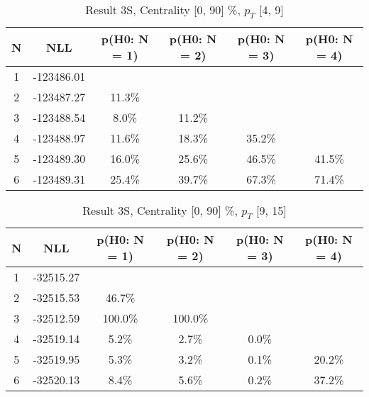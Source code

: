 \begin{table}[htb]
	\begin{center}
	\caption{Result 3S, Centrality [0, 90] \%, $p_{T}$ [4, 9] \GeV
}
{\footnotesize\renewcommand{\arraystretch}{1.4}
		\begin{tabular}{cc||>{\columncolor[gray]{0.8}}cccc}
			N & NLL & p(H0: N = 1) & p(H0: N = 2) & p(H0: N = 3) & p(H0: N = 4)\\ 
		\hline
1 & -123486.01 & & & & \\
2 & -123487.27 & 11.3\% & & & \\
3 & -123488.54 & 8.0\% & 11.2\% & & \\
4 & -123488.97 & 11.6\% & 18.3\% & 35.2\% & \\
5 & -123489.30 & 16.0\% & 25.6\% & 46.5\% & 41.5\% \\
6 & -123489.31 & 25.4\% & 39.7\% & 67.3\% & 71.4\% \\
	\end{tabular}
		\label{tab:lab}
	}
	\end{center}\end{table}

\begin{table}[htb]
	\begin{center}
	\caption{Result 3S, Centrality [0, 90] \%, $p_{T}$ [9, 15] \GeV
}
{\footnotesize\renewcommand{\arraystretch}{1.4}
		\begin{tabular}{cc||>{\columncolor[gray]{0.8}}cccc}
			N & NLL & p(H0: N = 1) & p(H0: N = 2) & p(H0: N = 3) & p(H0: N = 4)\\ 
		\hline
1 & -32515.27 & & & & \\
2 & -32515.53 & 46.7\% & & & \\
3 & -32512.59 & 100.0\% & 100.0\% & & \\
4 & -32519.14 & 5.2\% & 2.7\% & 0.0\% & \\
5 & -32519.95 & 5.3\% & 3.2\% & 0.1\% & 20.2\% \\
6 & -32520.13 & 8.4\% & 5.6\% & 0.2\% & 37.2\% \\
	\end{tabular}
		\label{tab:lab}
	}
	\end{center}\end{table}

